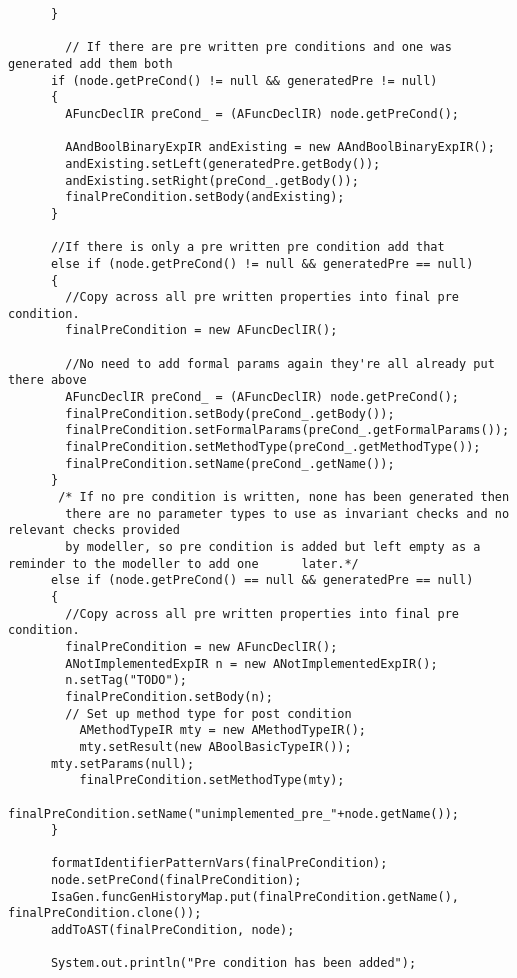 \begin{appendices}
\begin{lstlisting}
      }
        
        // If there are pre written pre conditions and one was generated add them both
      if (node.getPreCond() != null && generatedPre != null)
      {
        AFuncDeclIR preCond_ = (AFuncDeclIR) node.getPreCond();
        
        AAndBoolBinaryExpIR andExisting = new AAndBoolBinaryExpIR();
        andExisting.setLeft(generatedPre.getBody());
        andExisting.setRight(preCond_.getBody());
        finalPreCondition.setBody(andExisting);
      }
      
      //If there is only a pre written pre condition add that
      else if (node.getPreCond() != null && generatedPre == null)
      {
        //Copy across all pre written properties into final pre condition.
        finalPreCondition = new AFuncDeclIR();
        
        //No need to add formal params again they're all already put there above
        AFuncDeclIR preCond_ = (AFuncDeclIR) node.getPreCond();
        finalPreCondition.setBody(preCond_.getBody());
        finalPreCondition.setFormalParams(preCond_.getFormalParams());
        finalPreCondition.setMethodType(preCond_.getMethodType());
        finalPreCondition.setName(preCond_.getName());
      }
       /* If no pre condition is written, none has been generated then
        there are no parameter types to use as invariant checks and no relevant checks provided
        by modeller, so pre condition is added but left empty as a reminder to the modeller to add one      later.*/
      else if (node.getPreCond() == null && generatedPre == null)
      {
        //Copy across all pre written properties into final pre condition.
        finalPreCondition = new AFuncDeclIR();
        ANotImplementedExpIR n = new ANotImplementedExpIR();
        n.setTag("TODO");
        finalPreCondition.setBody(n);
        // Set up method type for post condition
          AMethodTypeIR mty = new AMethodTypeIR();
          mty.setResult(new ABoolBasicTypeIR());
      mty.setParams(null);
          finalPreCondition.setMethodType(mty);
        finalPreCondition.setName("unimplemented_pre_"+node.getName());
      }
    
      formatIdentifierPatternVars(finalPreCondition);
      node.setPreCond(finalPreCondition);
      IsaGen.funcGenHistoryMap.put(finalPreCondition.getName(), finalPreCondition.clone());
      addToAST(finalPreCondition, node);
      
      System.out.println("Pre condition has been added");
   

\end{lstlisting}
\end{appendices}
